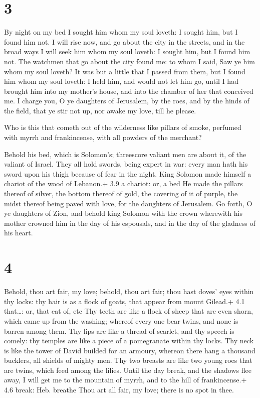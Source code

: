 \hypertarget{section-2}{%
\section{3}\label{section-2}}

 By night on my bed I sought him whom my soul loveth: I
sought him, but I found him not.  I will rise now, and go
about the city in the streets, and in the broad ways I will seek him
whom my soul loveth: I sought him, but I found him not.  The
watchmen that go about the city found me: to whom I said, Saw ye him
whom my soul loveth?  It was but a little that I passed from
them, but I found him whom my soul loveth: I held him, and would not let
him go, until I had brought him into my mother's house, and into the
chamber of her that conceived me.  I charge you, O ye
daughters of Jerusalem, by the roes, and by the hinds of the field, that
ye stir not up, nor awake my love, till he please.

 Who is this that cometh out of the wilderness like
pillars of smoke, perfumed with myrrh and frankincense, with all powders
of the merchant?

 Behold his bed, which is Solomon's; threescore valiant men
are about it, of the valiant of Israel.  They all hold
swords, being expert in war: every man hath his sword upon his thigh
because of fear in the night.  King Solomon made himself a
chariot of the wood of Lebanon.+ 3.9 a chariot: or, a bed 
He made the pillars thereof of silver, the bottom thereof of gold, the
covering of it of purple, the midst thereof being paved with love, for
the daughters of Jerusalem.  Go forth, O ye daughters of
Zion, and behold king Solomon with the crown wherewith his mother
crowned him in the day of his espousals, and in the day of the gladness
of his heart.

\hypertarget{section-3}{%
\section{4}\label{section-3}}

 Behold, thou art fair, my love; behold, thou art fair; thou
hast doves' eyes within thy locks: thy hair is as a flock of goats, that
appear from mount Gilead.+ 4.1 that\ldots: or, that eat of, etc
 Thy teeth are like a flock of sheep that are even shorn,
which came up from the washing; whereof every one bear twins, and none
is barren among them.  Thy lips are like a thread of
scarlet, and thy speech is comely: thy temples are like a piece of a
pomegranate within thy locks.  Thy neck is like the tower of
David builded for an armoury, whereon there hang a thousand bucklers,
all shields of mighty men.  Thy two breasts are like two
young roes that are twins, which feed among the lilies. 
Until the day break, and the shadows flee away, I will get me to the
mountain of myrrh, and to the hill of frankincense.+ 4.6 break: Heb.
breathe  Thou art all fair, my love; there is no spot in
thee.

